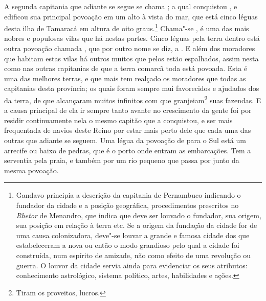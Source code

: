 A segunda capitania que adiante se segue se chama ; a qual
conquistou , e edificou sua principal povoação em um alto
à vista do mar, que está cinco léguas desta ilha de Tamaracá em
altura de oito graus.\footnote{ Gandavo principia a descrição da
capitania de Pernambuco indicando o fundador da cidade e a posição
geográfica, procedimentos prescritos no \textit{Rhetor} de Menandro,
que indica que deve ser louvado o fundador, sua origem, sua posição em
relação à terra etc. Se a origem da fundação da cidade for de uma
causa colonizadora, deve"-se louvar a grande e famosa cidade dos que
estabeleceram a nova ou então o modo grandioso pelo qual a cidade foi
construída, num espírito de amizade, não como efeito de uma revolução
ou guerra. O louvor da cidade servia ainda para evidenciar os seus
atributos: conhecimento astrológico, sistema político, artes,
habilidades e ações.} Chama"-se , é uma das mais nobres e populosas
vilas que há nestas partes. Cinco léguas pela terra dentro está outra
povoação chamada , que por outro nome se diz, a .
E além dos moradores que habitam estas vilas há outros muitos que pelos
 estão espalhados, assim nesta como nas outras
capitanias de que a terra comarcã 
toda está povoada. Esta é uma das
melhores terras, e que mais tem realçado os moradores que todas as
capitanias desta província; os quais foram sempre mui favorecidos e
ajudados dos  da terra, de que alcançaram muitos infinitos
 com que granjeiam\footnote{ Tiram os proveitos, lucros.} suas fazendas. E a causa principal de ela ir
sempre tanto avante no crescimento da gente foi por residir
continuamente nela o mesmo capitão que a conquistou, e ser mais
frequentada de navios deste Reino por estar mais perto dele que cada uma
das outras que adiante se seguem. Uma légua da povoação de  para
o Sul está um arrecife ou baixo de pedras, que é o porto onde entram as
embarcações. Tem a serventia pela praia, e também por um rio pequeno
que passa por junto da mesma povoação. 

